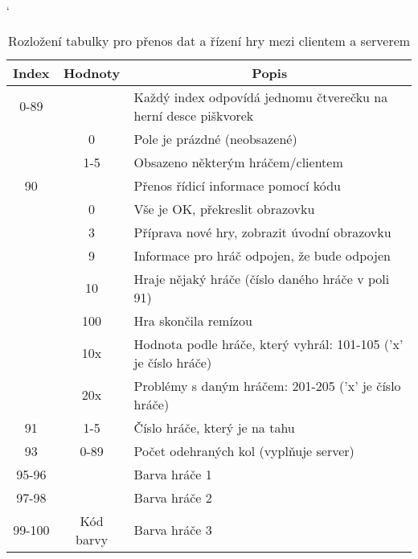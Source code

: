 \begin{table}[hbtp]
\catcode`
\caption{\label{tab:board_content}Rozložení tabulky pro přenos dat a řízení hry mezi clientem a serverem}
\begin{tabular}{|c|c|l|}
\hline
Index   & Hodnoty     & \multicolumn{1}{c|}{Popis}                                      \\ \hline
0-89    &             & Každý index odpovídá jednomu čtverečku na herní desce piškvorek \\ \cline{2-3} 
        & 0           & Pole je prázdné (neobsazené)                                    \\ \cline{2-3} 
        & 1-5         & Obsazeno některým hráčem/clientem                               \\ \hline
90      &             & Přenos řídicí informace pomocí kódu                             \\ \cline{2-3} 
        & 0           & Vše je OK, překreslit obrazovku                                 \\ \cline{2-3} 
        & 3           & Příprava nové hry, zobrazit úvodní obrazovku                    \\ \cline{2-3} 
        & 9           & Informace pro hráč odpojen, že bude odpojen                     \\ \cline{2-3} 
        & 10          & Hraje nějaký hráče (číslo daného hráče v poli 91)               \\ \cline{2-3} 
        & 100         & Hra skončila remízou                                            \\ \cline{2-3} 
        & 10x         & Hodnota podle hráče, který vyhrál: 101-105 ('x' je číslo hráče) \\ \cline{2-3} 
        & 20x         & Problémy s daným hráčem: 201-205 ('x' je číslo hráče)           \\ \hline
91      & 1-5         & Číslo hráče, který je na tahu                                   \\ \hline
93      & 0-89        & Počet odehraných kol (vyplňuje server)                          \\ \hline
95-96   &             & Barva hráče 1                                                   \\ \cline{1-1} \cline{3-3} 
97-98   &             & Barva hráče 2                                                   \\ \cline{1-1} \cline{3-3} 
99-100  & Kód barvy   & Barva hráče 3                                                   \\ \cline{1-1} \cline{3-3} 

\end{tabular}
\end{table}
